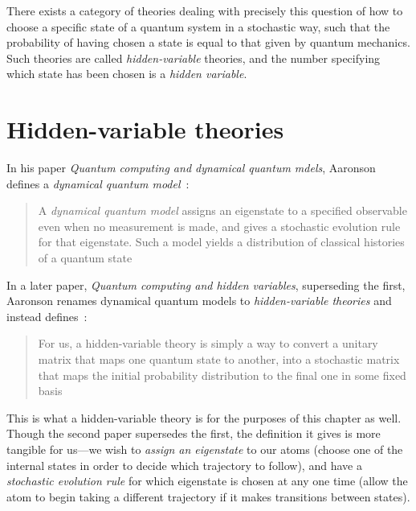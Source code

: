 There exists a category of theories dealing with precisely this question of how to choose a specific state of a quantum system in a stochastic way, such that the probability of having chosen a state is equal to that given by quantum mechanics. Such theories are called \emph{hidden-variable} theories, and the number specifying which state has been chosen is a \emph{hidden variable}.

\section{Hidden-variable theories}\label{sec:hidden_variable_theories}

In his paper \emph{Quantum computing and dynamical quantum mdels}, Aaronson defines a \emph{dynamical quantum model}~\cite{aaronson_quantum_2002}:

\begin{quote}
A \emph{dynamical quantum model} assigns an eigenstate to a specified observable even when no measurement is made, and gives a stochastic evolution rule for that eigenstate. Such a model yields a distribution of classical histories of a quantum state
\end{quote}
In a later paper, \emph{Quantum computing and hidden variables}, superseding the first, Aaronson renames dynamical quantum models to \emph{hidden-variable theories} and instead defines~\cite{PhysRevA.71.032325}:
\begin{quote}
For us, a hidden-variable theory is simply a way to convert a unitary matrix that maps one quantum state to another, into a stochastic matrix that maps the initial probability distribution to the final one in some fixed basis
\end{quote}
This is what a hidden-variable theory is for the purposes of this chapter as well. Though the second paper supersedes the first, the definition it gives is more tangible for us---we wish to \emph{assign an eigenstate} to our atoms (choose one of the internal states in order to decide which trajectory to follow), and have a \emph{stochastic evolution rule} for which eigenstate is chosen at any one time (allow the atom to begin taking a different trajectory if it makes transitions between states).

